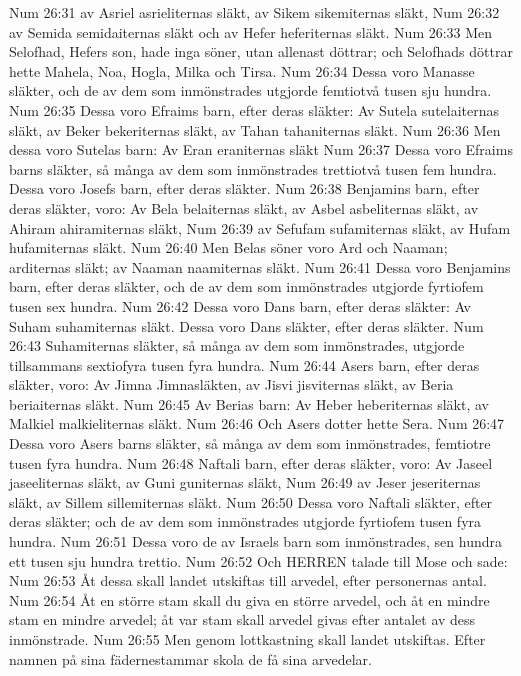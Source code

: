 Num 26:31  av Asriel asrieliternas släkt, av Sikem sikemiternas släkt,
Num 26:32  av Semida semidaiternas släkt och av Hefer heferiternas släkt.
Num 26:33  Men Selofhad, Hefers son, hade inga söner, utan allenast döttrar; och Selofhads döttrar hette Mahela, Noa, Hogla, Milka och Tirsa.
Num 26:34  Dessa voro Manasse släkter, och de av dem som inmönstrades utgjorde femtiotvå tusen sju hundra.
Num 26:35  Dessa voro Efraims barn, efter deras släkter: Av Sutela sutelaiternas släkt, av Beker bekeriternas släkt, av Tahan tahaniternas släkt.
Num 26:36  Men dessa voro Sutelas barn: Av Eran eraniternas släkt
Num 26:37  Dessa voro Efraims barns släkter, så många av dem som inmönstrades trettiotvå tusen fem hundra. Dessa voro Josefs barn, efter deras släkter.
Num 26:38  Benjamins barn, efter deras släkter, voro: Av Bela belaiternas släkt, av Asbel asbeliternas släkt, av Ahiram ahiramiternas släkt,
Num 26:39  av Sefufam sufamiternas släkt, av Hufam hufamiternas släkt.
Num 26:40  Men Belas söner voro Ard och Naaman; arditernas släkt; av Naaman naamiternas släkt.
Num 26:41  Dessa voro Benjamins barn, efter deras släkter, och de av dem som inmönstrades utgjorde fyrtiofem tusen sex hundra.
Num 26:42  Dessa voro Dans barn, efter deras släkter: Av Suham suhamiternas släkt. Dessa voro Dans släkter, efter deras släkter.
Num 26:43  Suhamiternas släkter, så många av dem som inmönstrades, utgjorde tillsammans sextiofyra tusen fyra hundra.
Num 26:44  Asers barn, efter deras släkter, voro: Av Jimna Jimnasläkten, av Jisvi jisviternas släkt, av Beria beriaiternas släkt.
Num 26:45  Av Berias barn: Av Heber heberiternas släkt, av Malkiel malkieliternas släkt.
Num 26:46  Och Asers dotter hette Sera.
Num 26:47  Dessa voro Asers barns släkter, så många av dem som inmönstrades, femtiotre tusen fyra hundra.
Num 26:48  Naftali barn, efter deras släkter, voro: Av Jaseel jaseeliternas släkt, av Guni guniternas släkt,
Num 26:49  av Jeser jeseriternas släkt, av Sillem sillemiternas släkt.
Num 26:50  Dessa voro Naftali släkter, efter deras släkter; och de av dem som inmönstrades utgjorde fyrtiofem tusen fyra hundra.
Num 26:51  Dessa voro de av Israels barn som inmönstrades, sen hundra ett tusen sju hundra trettio.
Num 26:52  Och HERREN talade till Mose och sade:
Num 26:53  Åt dessa skall landet utskiftas till arvedel, efter personernas antal.
Num 26:54  Åt en större stam skall du giva en större arvedel, och åt en mindre stam en mindre arvedel; åt var stam skall arvedel givas efter antalet av dess inmönstrade.
Num 26:55  Men genom lottkastning skall landet utskiftas. Efter namnen på sina fädernestammar skola de få sina arvedelar.
